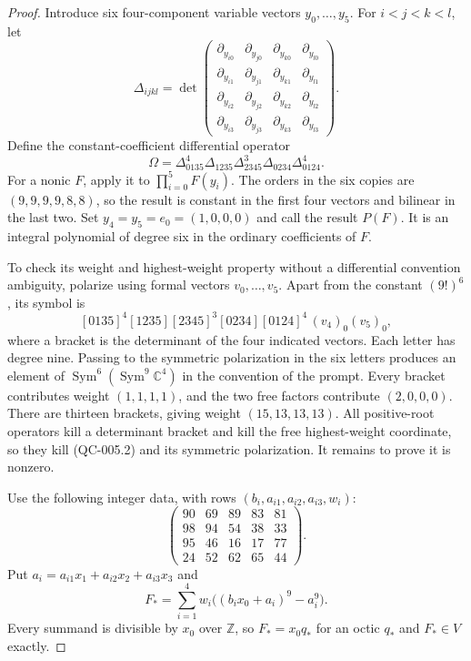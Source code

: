\begin{proof}
Introduce six four-component variable vectors $y_0,\ldots,y_5$.
For $i<j<k<l$, let
\[
 \Delta_{ijkl}=
 \det\begin{pmatrix}
 \partial_{y_{i0}}&\partial_{y_{j0}}&\partial_{y_{k0}}&\partial_{y_{l0}}\\
 \partial_{y_{i1}}&\partial_{y_{j1}}&\partial_{y_{k1}}&\partial_{y_{l1}}\\
 \partial_{y_{i2}}&\partial_{y_{j2}}&\partial_{y_{k2}}&\partial_{y_{l2}}\\
 \partial_{y_{i3}}&\partial_{y_{j3}}&\partial_{y_{k3}}&\partial_{y_{l3}}
 \end{pmatrix}.
\]
Define the constant-coefficient differential operator
\[
 \Omega=\Delta_{0135}^{4}\Delta_{1235}
                \Delta_{2345}^{3}\Delta_{0234}\Delta_{0124}^{4}.
 \tag{QC-005.1}
\]
For a nonic $F$, apply it to $\prod_{i=0}^5F(y_i)$.
The orders in the six copies are $(9,9,9,9,8,8)$, so the result
is constant in the first four vectors and bilinear in the last
two. Set $y_4=y_5=e_0=(1,0,0,0)$ and call the result $P(F)$.
It is an integral polynomial of degree six in the ordinary
coefficients of $F$.

To check its weight and highest-weight property without a
differential convention ambiguity, polarize using formal vectors
$v_0,\ldots,v_5$. Apart from the constant $(9!)^6$, its symbol is
\[
 [0135]^4[1235][2345]^3[0234][0124]^4\,(v_4)_0(v_5)_0,
 \tag{QC-005.2}
\]
where a bracket is the determinant of the four indicated vectors.
Each letter has degree nine. Passing to the symmetric polarization
in the six letters produces an element of
$\operatorname{Sym}^6(\operatorname{Sym}^9\mathbb C^4)$ in the
convention of the prompt. Every bracket contributes weight
$(1,1,1,1)$, and the two free factors contribute $(2,0,0,0)$.
There are thirteen brackets, giving weight $(15,13,13,13)$.
All positive-root operators kill a determinant bracket and kill
the free highest-weight coordinate, so they kill (QC-005.2) and
its symmetric polarization. It remains to prove it is nonzero.

Use the following integer data, with rows $(b_i,a_{i1},a_{i2},a_{i3},w_i)$:
\[
\begin{pmatrix}
90&69&89&83&81\\
98&94&54&38&33\\
95&46&16&17&77\\
24&52&62&65&44
\end{pmatrix}.
\]
Put $a_i=a_{i1}x_1+a_{i2}x_2+a_{i3}x_3$ and
\[
 F_* = \sum_{i=1}^4w_i\bigl((b_ix_0+a_i)^9-a_i^9\bigr).
 \tag{QC-005.3}
\]
Every summand is divisible by $x_0$ over $\mathbb Z$, so
$F_*=x_0q_*$ for an octic $q_*$ and $F_*\in V$ exactly.


\end{proof}
